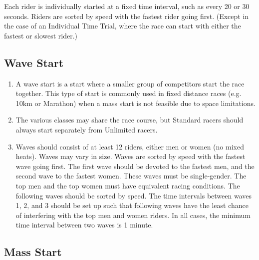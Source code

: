 Each rider is individually started at a fixed time interval, such as every 20 or 30 seconds.
Riders are sorted by speed with the fastest rider going first.
(Except in the case of an Individual Time Trial, where the race can start with either the fastest or slowest rider.)

\subsection{Wave Start \label{subsec:road_heat-assignment_heat-start}}

\begin{enumerate}[leftmargin=1.5em,labelsep=*]
	\item A wave start is a start where a smaller group of competitors start the race together.
	This type of start is commonly used in fixed distance races (e.g. 10km or Marathon) when a mass start is not feasible due to space limitations.
	\item The various classes may share the race course, but Standard racers should always start separately from Unlimited racers.
	\item Waves should consist of at least 12 riders, either men or women (no mixed heats).
	Waves may vary in size.
	Waves are sorted by speed with the fastest wave going first.
	The first wave should be devoted to the fastest men, and the second wave to the fastest women.
	These waves must be single-gender.
	The top men and the top women must have equivalent racing conditions.
	The following waves should be sorted by speed.
	The time intervals between waves 1, 2, and 3 should be set up such that following waves have the least chance of interfering with the top men and women riders.
	In all cases, the minimum time interval between two waves is 1 minute.
\end{enumerate}

\subsection{Mass Start \label{subsec:road_heat-assignment_mass-start}}

